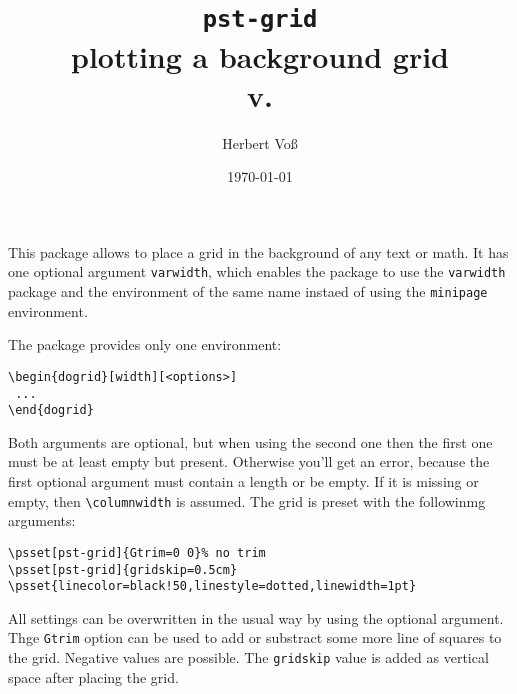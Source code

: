 \documentclass[dvips,a4paper,english]{article}
\let\pstGRIDFV\fileversion
\begin{document}
\title{\texttt{pst-grid}\\[1cm]
plotting a background grid\\[5mm]
		  {\small v.\pstGRIDFV}}
\author{Herbert Vo\ss}%
\date{\today}

\maketitle

This package allows to place a grid in the background of any text or math. 
It has one optional argument \verb+varwidth+, which enables the package to
use the \verb+varwidth+ package and the environment of the same name instaed
of using the \verb+minipage+ environment.

The package provides only one environment:

\begin{lstlisting}[style=syntax]
\begin{dogrid}[width][<options>]
 ...
\end{dogrid}
\end{lstlisting}

Both arguments are optional, but when using the second one then the first one must be
at least empty but present. Otherwise you'll get an error, because the first optional
argument must contain a length or be empty. If it is missing or empty, then \verb+\columnwidth+
is assumed. The grid is preset with the followinmg arguments:

\begin{lstlisting}
\psset[pst-grid]{Gtrim=0 0}% no trim
\psset[pst-grid]{gridskip=0.5cm}
\psset{linecolor=black!50,linestyle=dotted,linewidth=1pt}
\end{lstlisting}

All settings can be overwritten in the usual way by using the optional argument.
Thge \verb+Gtrim+ option can be used to add or substract some more line of squares
to the grid. Negative values are possible. The \verb+gridskip+ value is added
as vertical space after placing the grid.
\end{document}
